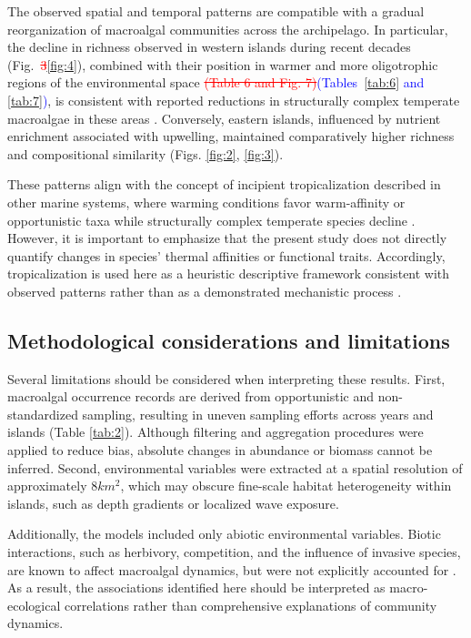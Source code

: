 \documentclass[a4paper,fleqn]{cas-sc}
\DeclareRobustCommand{\deleted}[1]{\textcolor{red}{\sout{#1}}}
\DeclareRobustCommand{\added}[1]{\textcolor{blue}{#1}}
\begin{document}
The observed spatial and temporal patterns are compatible with a gradual reorganization of macroalgal communities across the archipelago. In particular, the decline in richness observed in western islands during recent decades (Fig.~\deleted{3}\added{\ref{fig:4}}), combined with their position in warmer and more oligotrophic regions of the environmental space \deleted{(Table 6 and Fig. 7)}\added{(Tables~\ref{tab:6} and \ref{tab:7})}, is consistent with reported reductions in structurally complex temperate macroalgae in these areas \citep{RIERA2015, Valdazoetal2017}. Conversely, eastern islands, influenced by nutrient enrichment associated with upwelling, maintained comparatively higher richness and compositional similarity (Figs. \ref{fig:2}, \ref{fig:3}).

These patterns align with the concept of incipient tropicalization described in other marine systems, where warming conditions favor warm-affinity or opportunistic taxa while structurally complex temperate species decline \citep{Vergesetal2016, Wernbergetal2016}. However, it is important to emphasize that the present study does not directly quantify changes in species' thermal affinities or functional traits. Accordingly, tropicalization is used here as a heuristic descriptive framework consistent with observed patterns rather than as a demonstrated mechanistic process \citep{Wernbergetal2016}.

\subsection{Methodological considerations and limitations}

Several limitations should be considered when interpreting these results. First, macroalgal occurrence records are derived from opportunistic and non-standardized sampling, resulting in uneven sampling efforts across years and islands (Table \ref{tab:2}). Although filtering and aggregation procedures were applied to reduce bias, absolute changes in abundance or biomass cannot be inferred. Second, environmental variables were extracted at a spatial resolution of approximately $8 km^2$, which may obscure fine-scale habitat heterogeneity within islands, such as depth gradients or localized wave exposure.

Additionally, the models included only abiotic environmental variables. Biotic interactions, such as herbivory, competition, and the influence of invasive species, are known to affect macroalgal dynamics, but were not explicitly accounted for \citep{RILOV2020105045, JI202191}. As a result, the associations identified here should be interpreted as macro-ecological correlations rather than comprehensive explanations of community dynamics.
\end{document}
